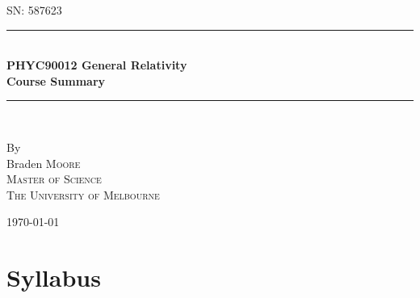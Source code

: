 \documentclass[a4paper]{article} %
\begin{document}
\pagestyle{empty}

\newcommand{\HRule}{\rule{\linewidth}{0.5mm}}

\begin{titlepage}

    \begin{center}
        \textsc{\large SN: 587623}\\[6cm]

        \HRule \\[0.5cm]
		\Huge \textbf{PHYC90012 General Relativity}\\[0.5cm]
        \huge \textbf{Course Summary}\\[0.5cm] 
        \HRule \\[1.5cm]
        \begin{minipage}{0.4\textwidth}
        \begin{center}

        \large By \\[0.75cm]
        \huge Braden \scshape Moore \\[0.5cm]
        \normalsize \normalfont Master of Science \\
        The University of Melbourne \\

        \end{center}
        \end{minipage}

        \vfill

        \large \today
    \end{center}


\newpage
\end{titlepage}
\pagestyle{empty}
\tableofcontents
\newpage

\pagestyle{fancy}
\lfoot{\textsc{\today}}
\setcounter{page}{1}
\setcounter{section}{-1}
\section{Syllabus}
\end{document}
